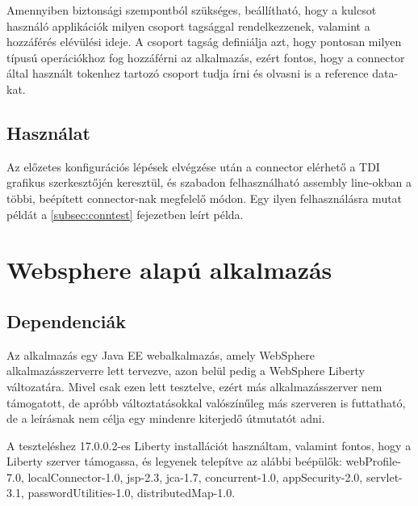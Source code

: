 Amennyiben biztonsági szempontból szükséges, beállítható, hogy a kulcsot használó applikációk milyen csoport tagsággal rendelkezzenek, valamint a hozzáférés elévülési ideje. A csoport tagság definiálja azt, hogy pontosan milyen típusú operációkhoz fog hozzáférni az alkalmazás, ezért fontos, hogy a connector által használt tokenhez tartozó csoport tudja írni és olvasni is a reference data-kat.

\subsection{Használat}
Az előzetes konfigurációs lépések elvégzése után a connector elérhető a TDI grafikus szerkesztőjén keresztül, és szabadon felhasználható assembly line-okban a többi, beépített connector-nak megfelelő módon. Egy ilyen felhasználásra mutat példát a \ref{subsec:conntest} fejezetben leírt példa. \cite{tditutorial}
\section{Websphere alapú alkalmazás}
\subsection{Dependenciák}
Az alkalmazás egy Java EE webalkalmazás, amely WebSphere alkalmazásszerverre lett tervezve, azon belül pedig a WebSphere Liberty változatára. Mivel csak ezen lett tesztelve, ezért más alkalmazásszerver nem támogatott, de apróbb változtatásokkal valószínűleg más szerveren is futtatható, de a leírásnak nem célja egy mindenre kiterjedő útmutatót adni. 

A teszteléshez 17.0.0.2-es Liberty installációt használtam, valamint fontos, hogy a Liberty szerver támogassa, és legyenek telepítve az alábbi beépülők: webProfile-7.0, localConnector-1.0, jsp-2.3, jca-1.7, concurrent-1.0, appSecurity-2.0, servlet-3.1, passwordUtilities-1.0, distributedMap-1.0.

%

